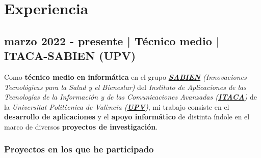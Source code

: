 \documentclass[letterpaper, 12pt, dvipsnames]{article}
\newcommand{\upvName}{Universitat Politècnica de València}
\newcommand{\upv}{UPV}
\newcommand{\upvUrl}{https://www.upv.es/es}
\newcommand{\sabien}{SABIEN}
\newcommand{\itacaSabien}{ITACA-SABIEN}
\newcommand{\sabienUrl}{http://www.sabien.upv.es/}
\begin{document}
\begin{adjustwidth}{-1.5cm}{}
\end{adjustwidth}

\pagebreak

\section*{Experiencia}

\subsection*{marzo 2022 - presente | Técnico medio | {\itacaSabien} (\upv)}

Como \textbf{técnico medio en informática} en el grupo \emph{\textbf{\href{\sabienUrl}{\sabien}} (Innovaciones Tecnológicas para la Salud y el Bienestar)} del \emph{Instituto de Aplicaciones de las Tecnologías de la Información y de las Comunicaciones Avanzadas (\textbf{\href{http://www.itaca.upv.es/}{ITACA}})} de la \emph{{\upvName} (\textbf{\href{\upvUrl}{\upv}})}, mi trabajo consiste en el \textbf{desarrollo de aplicaciones} y el \textbf{apoyo informático} de distinta índole en el marco de diversos \textbf{proyectos de investigación}.

\subsubsection*{Proyectos en los que he participado}
\end{document}
